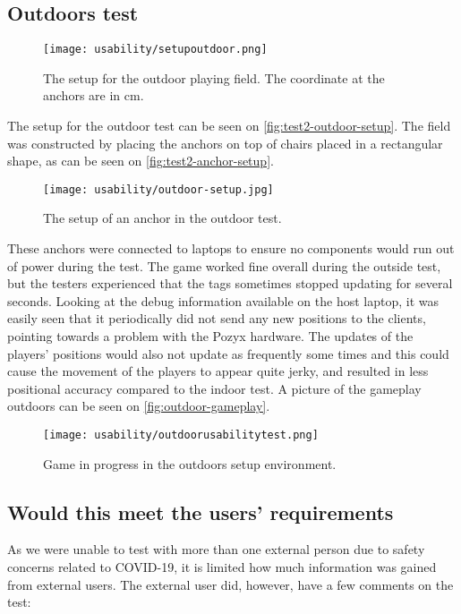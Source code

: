 \subsection{Outdoors test}
\begin{figure}[H]
    \centering
    \texttt{[image: usability/setupoutdoor.png]}
    \caption{The setup for the outdoor playing field. The coordinate at the anchors are in cm.}
    \label{fig:test2-outdoor-setup}
\end{figure}
\noindent
The setup for the outdoor test can be seen on \autoref{fig:test2-outdoor-setup}.
The field was constructed by placing the anchors on top of chairs placed in a rectangular shape, as can be seen on \autoref{fig:test2-anchor-setup}.
\begin{figure}[H]
    \centering
    \texttt{[image: usability/outdoor-setup.jpg]}
    \caption{The setup of an anchor in the outdoor test.}
    \label{fig:test2-anchor-setup}
\end{figure}
\noindent
These anchors were connected to laptops to ensure no components would run out of power during the test.
The game worked fine overall during the outside test, but the testers experienced that the tags sometimes stopped updating for several seconds.
Looking at the debug information available on the host laptop, it was easily seen that it periodically did not send any new positions to the clients, pointing towards a problem with the Pozyx hardware.
The updates of the players' positions would also not update as frequently some times and this could cause the movement of the players to appear quite jerky, and resulted in less positional accuracy compared to the indoor test.
A picture of the gameplay outdoors can be seen on \autoref{fig:outdoor-gameplay}.
\begin{figure}[H]
    \centering
    \texttt{[image: usability/outdoorusabilitytest.png]}
    \caption{Game in progress in the outdoors setup environment.}
    \label{fig:outdoor-gameplay}
\end{figure}

\subsection{Would this meet the users' requirements}
As we were unable to test with more than one external person due to safety concerns related to COVID-19, it is limited how much information was gained from external users.
The external user did, however, have a few comments on the test:

